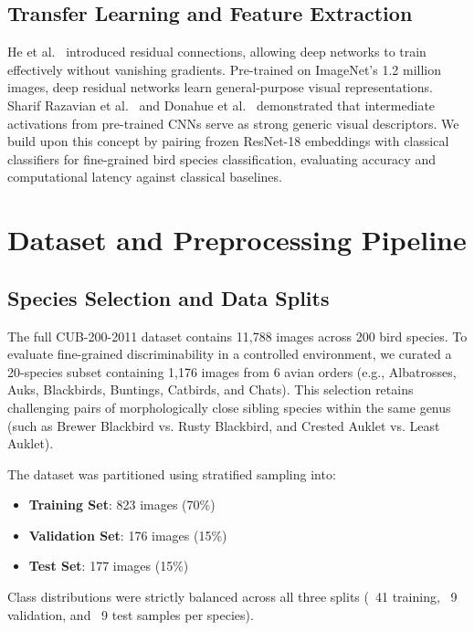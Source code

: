 \documentclass[conference]{IEEEtran}
\begin{document}
\subsection{Transfer Learning and Feature Extraction}
He et al.~\cite{he2016resnet} introduced residual connections, allowing deep networks to train effectively without vanishing gradients. Pre-trained on ImageNet's 1.2 million images, deep residual networks learn general-purpose visual representations. Sharif Razavian et al.~\cite{sharif2014cnn} and Donahue et al.~\cite{donahue2014decaf} demonstrated that intermediate activations from pre-trained CNNs serve as strong generic visual descriptors. We build upon this concept by pairing frozen ResNet-18 embeddings with classical classifiers for fine-grained bird species classification, evaluating accuracy and computational latency against classical baselines.

\section{Dataset and Preprocessing Pipeline}
\label{sec:data}

\subsection{Species Selection and Data Splits}
The full CUB-200-2011 dataset contains 11,788 images across 200 bird species. To evaluate fine-grained discriminability in a controlled environment, we curated a 20-species subset containing 1,176 images from 6 avian orders (e.g., Albatrosses, Auks, Blackbirds, Buntings, Catbirds, and Chats). This selection retains challenging pairs of morphologically close sibling species within the same genus (such as Brewer Blackbird vs. Rusty Blackbird, and Crested Auklet vs. Least Auklet).

The dataset was partitioned using stratified sampling into:
\begin{itemize}
    \item \textbf{Training Set}: 823 images (70\%)
    \item \textbf{Validation Set}: 176 images (15\%)
    \item \textbf{Test Set}: 177 images (15\%)
\end{itemize}
Class distributions were strictly balanced across all three splits (~41 training, ~9 validation, and ~9 test samples per species).
\end{document}

